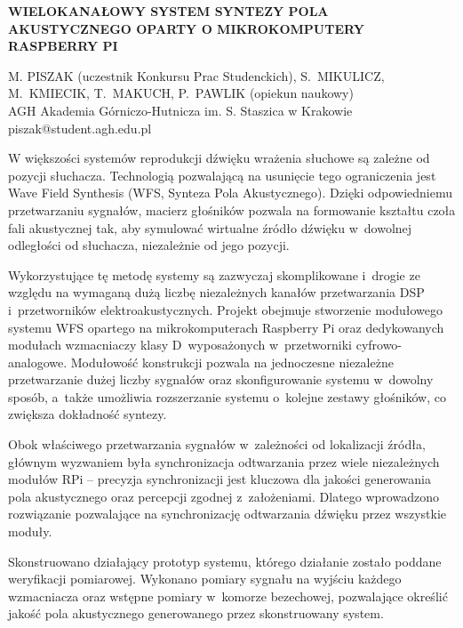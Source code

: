 \documentclass[10pt, a4paper]{article}
\begin{document}
\pagestyle{empty}

\begin{center}
	\large\textbf{\MakeUppercase{Wielokanałowy system syntezy pola akustycznego oparty o mikrokomputery Raspberry Pi}}
\end{center}
\vspace{22pt}

\noindent\MakeUppercase{M. Piszak} (uczestnik Konkursu Prac Studenckich), \MakeUppercase{S.~Mikulicz, M.~Kmiecik,} \linebreak \MakeUppercase{T.~Makuch, P.~Pawlik} (opiekun naukowy)\\

\noindent AGH Akademia Górniczo-Hutnicza im. S. Staszica w Krakowie\\

\noindent piszak@student.agh.edu.pl

\vspace{22pt}

W większości systemów reprodukcji dźwięku wrażenia słuchowe są zależne od pozycji słuchacza. Technologią pozwalającą na usunięcie tego ograniczenia jest Wave Field Synthesis (WFS, Synteza Pola Akustycznego). Dzięki odpowiedniemu przetwarzaniu sygnałów, macierz głośników pozwala na formowanie kształtu czoła fali akustycznej tak, aby symulować wirtualne źródło dźwięku w~dowolnej odległości od słuchacza, niezależnie od jego pozycji.

Wykorzystujące tę metodę systemy są zazwyczaj skomplikowane i~drogie ze względu na wymaganą dużą liczbę niezależnych kanałów przetwarzania DSP i~przetworników elektroakustycznych. Projekt obejmuje stworzenie modułowego systemu WFS opartego na mikrokomputerach Raspberry Pi oraz dedykowanych modułach wzmacniaczy klasy D~wyposażonych w~przetworniki cyfrowo-analogowe. Modułowość konstrukcji pozwala na jednoczesne niezależne przetwarzanie dużej liczby sygnałów oraz skonfigurowanie systemu w~dowolny sposób, a~także umożliwia rozszerzanie systemu o~kolejne zestawy głośników, co zwiększa dokładność syntezy.

Obok właściwego przetwarzania sygnałów w~zależności od lokalizacji źródła, głównym wyzwaniem była synchronizacja odtwarzania przez wiele niezależnych modułów RPi -- precyzja synchronizacji jest kluczowa dla jakości generowania pola akustycznego oraz percepcji zgodnej z~założeniami. Dlatego wprowadzono rozwiązanie pozwalające na synchronizację odtwarzania dźwięku przez wszystkie moduły.

Skonstruowano działający prototyp systemu, którego działanie zostało poddane weryfikacji pomiarowej. Wykonano pomiary sygnału na wyjściu każdego wzmacniacza oraz wstępne pomiary w~komorze bezechowej, pozwalające określić jakość pola akustycznego generowanego przez skonstruowany system.
\end{document}
